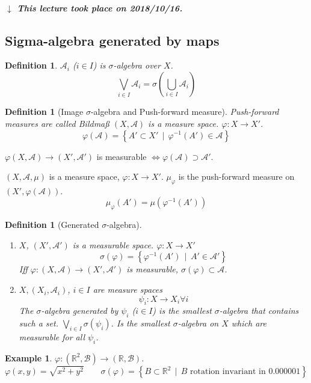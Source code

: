 \documentclass[a4paper]{article}
\newcounter{lecref}[section]
\numberwithin{lecref}{section}
\theoremstyle{break}
\newtheorem*{Example}{Example}
\newtheorem{definition}[lecref]{Definition}
\newcommand{\dateref}[1]{%
  \begin{mdframed}[backgroundcolor=gray!10,innerbottommargin=0pt,innertopmargin=0pt]
    \paragraph{\textit{$\downarrow$ This lecture took place on #1.}}%
  \end{mdframed}%
}
\newcommand{\SetDef}[2]{\left\{#1\,\mid\,#2\right\}}
\begin{document}
\dateref{2018/10/16}

\subsection{Sigma-algebra generated by maps}

\begin{definition}
  $\mathcal A_i$ ($i \in I$) is $\sigma$-algebra over $X$.
  \[ \bigvee_{i \in I} \mathcal A_i = \sigma\left(\bigcup_{i \in I} \mathcal A_i\right) \]
\end{definition}

\begin{definition}[Image $\sigma$-algebra and Push-forward measure]
  Push-forward measures are called \foreignlanguage{german}{Bildmaß}
  $(X, \mathcal A)$ is a measure space. $\varphi: X \to X'$.
  \[ \varphi(\mathcal A) = \SetDef{A' \subset X'}{\varphi^{-1}(A') \in \mathcal A} \]
\end{definition}

$\varphi(X, \mathcal A) \to (X', \mathcal A')$ is measurable $\iff \varphi(\mathcal A) \supset \mathcal A'$.

$(X, \mathcal A, \mu)$ is a measure space, $\varphi: X \to X'$.
$\mu_{\varphi}$ is the push-forward measure on $(X', \varphi(\mathcal A))$.
\[ \mu_{\varphi}(A') = \mu(\varphi^{-1}(A')) \]

\begin{definition}[Generated $\sigma$-algebra]
  \begin{enumerate}
    \item $X$, $(X', \mathcal A')$ is a measurable space.
      $\varphi: X \to X'$
      \[ \sigma(\varphi) = \SetDef{\varphi^{-1}(A')}{A' \in \mathcal A'} \]
      Iff $\varphi: (X, \mathcal A) \to (X', \mathcal A')$ is measurable,
      $\sigma(\varphi) \subset \mathcal A$.
    \item $X, (X_i, \mathcal A_i)$, $i \in I$ are measure spaces
      \[ \psi_i: X \to X_i \forall i \]
      The $\sigma$-algebra generated by $\psi_i$ ($i \in I$) is the smallest $\sigma$-algebra that contains such a set.
      $\bigvee_{i \in I} \sigma(\psi_i)$. Is the smallest $\sigma$-algebra on $X$ which are measurable for all $\psi_i$.
  \end{enumerate}
\end{definition}

\begin{Example}
  $\varphi: (\mathbb R^2, \mathcal B) \to (\mathbb R, \mathcal B)$.
  \[ \varphi(x, y) = \sqrt{x^2 + y^2} \qquad \sigma(\varphi) = \SetDef{B \subset \mathbb R^2}{B \text{ rotation invariant in $0.000001$}} \]
\end{Example}
\end{document}
